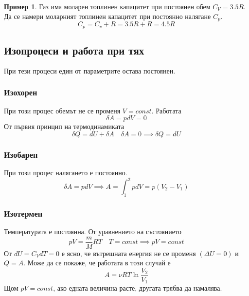 \documentclass[fleqn, 12pt]{article}
\theoremstyle{definition}
\newtheorem{example}{Пример}[subsection]
\begin{document}
\begin{example}
Газ има моларен топлинен капацитет при постоянен обем $C_V = 3.5R$.
Да се намери моларният топлинен капацитет при постоянно налягане $C_p$.
$$C_p = C_v + R = 3.5R + R = 4.5R$$
\end{example}

\subsection{Изопроцеси и работа при тях}
При тези процеси един от параметрите остава постоянен.

\subsubsection{Изохорен}
При този процес обемът не се променя $V = const$. Работата 
$$\delta A = pdV = 0$$
От първия принцип на термодинамиката
$$ \delta Q = dU + \delta A \quad \delta A = 0 \implies \delta Q = dU$$

\subsubsection{Изобарен}
При този процес налягането е постоянно.
$$\delta A = pdV \implies A = \int_{1}^2 pdV = p(V_2 - V_1)$$

\subsubsection{Изотермен}
Температурата е постоянна. От уравнението на състоянието 
$$pV = \frac{m}{M}RT \quad T = const \implies pV = const$$
От $dU = C_V dT = 0$ е ясно, че вътрешната енергия не се променя $(\Delta U = 0) $ и $Q = A$. 
Може да се покаже, че работата в този случай е
$$A = \nu RT \ln {\frac{V_2}{V_1}}$$
Щом $pV = const$, ако едната величина расте, другата трябва да намалява.
\end{document}
